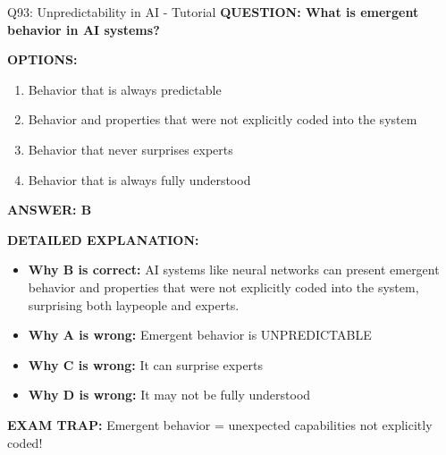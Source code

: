 \documentclass[8pt]{beamer}
\begin{document}
	\begin{frame}{Q93: Unpredictability in AI - Tutorial}
		\fontsize{6.5}{7.5}\selectfont
		\textbf{QUESTION: What is emergent behavior in AI systems?}
		
		\vspace{0.1cm}
		\textbf{OPTIONS:}
		\begin{enumerate}
			\item Behavior that is always predictable
			\item Behavior and properties that were not explicitly coded into the system
			\item Behavior that never surprises experts
			\item Behavior that is always fully understood
		\end{enumerate}
		
		\vspace{0.1cm}
		\textcolor{myblue}{\textbf{ANSWER: B}}
		
		\vspace{0.1cm}
		\textbf{DETAILED EXPLANATION:}
		\begin{itemize}
			\item \textbf{Why B is correct:} AI systems like neural networks can present emergent behavior and properties that were not explicitly coded into the system, surprising both laypeople and experts.
			\item \textbf{Why A is wrong:} Emergent behavior is UNPREDICTABLE
			\item \textbf{Why C is wrong:} It can surprise experts
			\item \textbf{Why D is wrong:} It may not be fully understood
		\end{itemize}
		
		\textcolor{myred}{\textbf{EXAM TRAP:}} Emergent behavior = \textcolor{myblue}{unexpected capabilities not explicitly coded}!
	\end{frame}
	
\end{document}
